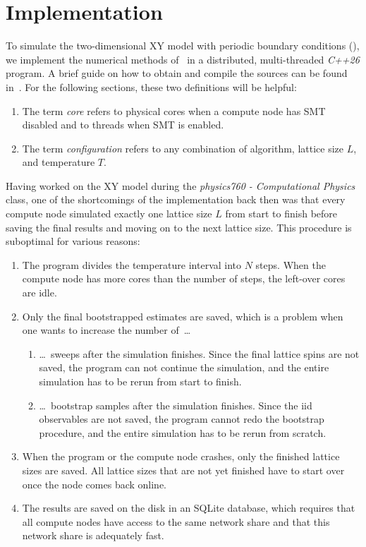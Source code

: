 \chapter{Implementation}\label{sec:impl}
	To simulate the two-dimensional XY model with periodic boundary conditions (), we implement the numerical methods of~ in a distributed, multi-threaded \emph{C++26} program. A brief guide on how to obtain and compile the sources can be found in~. For the following sections, these two definitions will be helpful:
	\begin{enumerate}
		\item The term \emph{core} refers to physical cores when a compute node has SMT disabled and to threads when SMT is enabled.
		\item The term \emph{configuration} refers to any combination of algorithm, lattice size $L$, and temperature $T$.
	\end{enumerate}
	
	Having worked on the XY model during the \emph{physics760 - Computational Physics} class, one of the shortcomings of the implementation back then was that every compute node simulated exactly one lattice size $L$ from start to finish before saving the final results and moving on to the next lattice size. This procedure is suboptimal for various reasons:
	\begin{enumerate}
		\item \label{shortcomings:cores} The program divides the temperature interval into $N$ steps. When the compute node has more cores than the number of steps, the left-over cores are idle.
		\item Only the final bootstrapped estimates are saved, which is a problem when one wants to increase the number of~\ldots
		\begin{enumerate}
			\item \label{shortcomings:sweeps}  \ldots~sweeps after the simulation finishes. Since the final lattice spins are not saved, the program can not continue the simulation, and the entire simulation has to be rerun from start to finish.
			\item \label{shortcomings:bootstrap} \ldots~bootstrap samples after the simulation finishes. Since the iid observables are not saved, the program cannot redo the bootstrap procedure, and the entire simulation has to be rerun from scratch.
		\end{enumerate}
		\item \label{shortcomings:crashed} When the program or the compute node crashes, only the finished lattice sizes are saved. All lattice sizes that are not yet finished have to start over once the node comes back online.
		\item \label{shortcomings:sqlite} The results are saved on the disk in an SQLite database, which requires that all compute nodes have access to the same network share and that this network share is adequately fast.
	\end{enumerate}